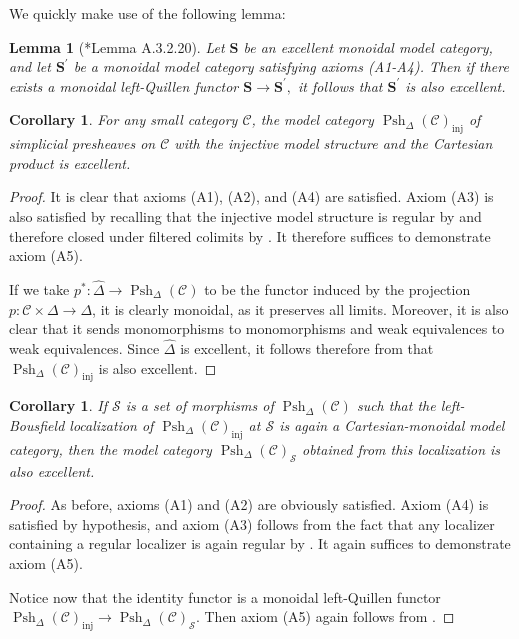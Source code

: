 \documentclass[a4paper]{article}
\numberwithin{equation}{subsection}
\theoremstyle{plain}   %
\newtheorem{cor}[equation]{Corollary}
\newtheorem{lemma}[equation]{Lemma}
\theoremstyle{definition}
\theoremstyle{remark}
\theoremstyle{plain}
\newcommand{\psh}[1]{\ensuremath{\widehat{#1}}}
\providecommand{\C}{}
\renewcommand{\C}{\ensuremath{\mathcal{C}}}
\newcommand{\setS}{\ensuremath{\mathscr{S}}}
\newcommand{\spsh}{\ensuremath{\operatorname{Psh}_\Delta(\mathcal{C})}}
\begin{document}
We quickly make use of the following lemma:
\begin{lemma}[\cite{htt}*{Lemma A.3.2.20}]\label{excellentlemma}
	Let \(\mathbf{S}\) be an excellent monoidal model category, and let \(\mathbf{S}^\prime\) be a monoidal model category satisfying axioms (A1-A4).  Then if there exists a monoidal left-Quillen functor \(\mathbf{S}\to \mathbf{S}^\prime,\) it follows that \(\mathbf{S}^\prime\) is also excellent.
\end{lemma}
\begin{cor}
	For any small category \(\C\), the model category \(\spsh_{\mathrm{inj}}\) of simplicial presheaves on \(\C\) with the injective model structure and the Cartesian product is excellent.
\end{cor}
\begin{proof}
	It is clear that axioms (A1), (A2), and (A4) are satisfied. Axiom (A3) is also satisfied by recalling that the injective model structure is regular by  and therefore closed under filtered colimits by . It therefore suffices to demonstrate axiom (A5).  
	
	If we take \(p^\ast: \psh{\Delta} \to \spsh\) to be the functor induced by the projection \(p:\C\times \Delta \to \Delta\), it is clearly monoidal, as it preserves all limits.  Moreover, it is also clear that it sends monomorphisms to monomorphisms and weak equivalences to weak equivalences. Since \(\psh{\Delta}\) is excellent, it follows therefore from  that \(\spsh_{\mathrm{inj}}\) is also excellent.
\end{proof}
\begin{cor}
	If \(\setS\) is a set of morphisms of \(\spsh\) such that the left-Bousfield localization of \(\spsh_{\mathrm{inj}}\) at \(\setS\) is again a Cartesian-monoidal model category, then the model category \(\spsh_{\setS}\) obtained from this localization is also excellent.
\end{cor}
\begin{proof}
	As before, axioms (A1) and (A2) are obviously satisfied.  Axiom (A4) is satisfied by hypothesis, and axiom (A3) follows from the fact that any localizer containing a regular localizer is again regular by .  It again suffices to demonstrate axiom (A5).

	Notice now that the identity functor is a monoidal left-Quillen functor \(\spsh_{\mathrm{inj}} \to \spsh_{\setS}\).  Then axiom (A5) again follows from .
\end{proof}
\end{document}
